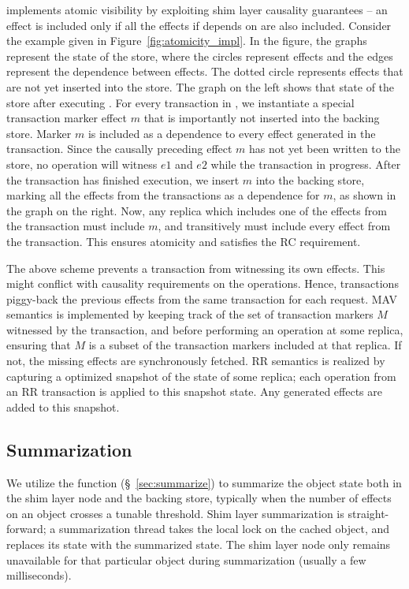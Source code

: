 \name implements atomic visibility by exploiting shim layer causality
guarantees -- an effect is included only if all the effects if depends on are
also included. Consider the example given in Figure~\ref{fig:atomicity_impl}.
In the figure, the graphs represent the state of the store, where the circles
represent effects and the edges represent the dependence between effects. The
dotted circle represents effects that are not yet inserted into the store.
The graph on the left shows that state of the store after executing .
For every transaction in \name, we instantiate a special transaction marker
effect $m$ that is importantly not inserted into the backing store. Marker $m$
is included as a dependence to every effect generated in the transaction. Since
the causally preceding effect $m$ has not yet been written to the store, no
operation will witness $e1$ and $e2$ while the transaction in progress. After
the transaction has finished execution, we insert $m$ into the backing store,
marking all the effects from the transactions as a dependence for $m$, as shown
in the graph on the right. Now, any replica which includes one of the effects
from the transaction must include $m$, and transitively must include every
effect from the transaction. This ensures atomicity and satisfies the RC
requirement.

The above scheme prevents a transaction from witnessing its own effects. This
might conflict with causality requirements on the operations. Hence,
transactions piggy-back the previous effects from the same transaction for each
request. MAV semantics is implemented by keeping track of the set of
transaction markers $M$ witnessed by the transaction, and before performing an
operation at some replica, ensuring that $M$ is a subset of the transaction
markers included at that replica. If not, the missing effects are synchronously
fetched. RR semantics is realized by capturing a optimized snapshot of the
state of some replica; each operation from an RR transaction is applied to this
snapshot state. Any generated effects are added to this snapshot.

\subsection{Summarization}

We utilize the  function (\S~\ref{sec:summarize}) to summarize
the object state both in the shim layer node and the backing store, typically
when the number of effects on an object crosses a tunable threshold.
Shim layer summarization is straight-forward; a summarization thread takes the
local lock on the cached object, and replaces its state with the summarized
state. The shim layer node only remains unavailable for that particular object
during summarization (usually a few milliseconds).

